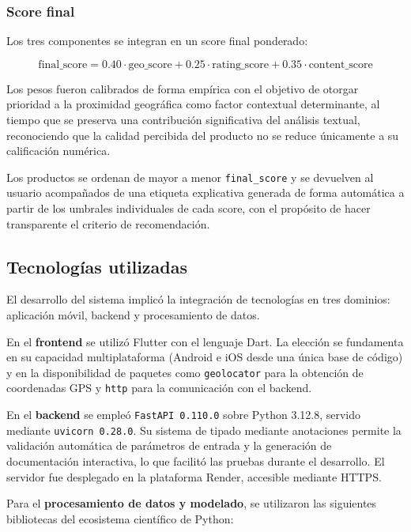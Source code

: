 \documentclass[11pt, letterpaper]{article}
\begin{document}
	\subsubsection*{Score final}
	
	Los tres componentes se integran en un score final ponderado:
	
	\begin{equation}
		\text{final\_score} = 0.40 \cdot \text{geo\_score}
		+ 0.25 \cdot \text{rating\_score}
		+ 0.35 \cdot \text{content\_score}
		\label{eq:final_score}
	\end{equation}
	
	Los pesos fueron calibrados de forma empírica con el objetivo de otorgar
	prioridad a la proximidad geográfica como factor contextual determinante,
	al tiempo que se preserva una contribución significativa del análisis textual,
	reconociendo que la calidad percibida del producto no se reduce únicamente
	a su calificación numérica.
	
	Los productos se ordenan de mayor a menor \texttt{final\_score} y se
	devuelven al usuario acompañados de una etiqueta explicativa generada de
	forma automática a partir de los umbrales individuales de cada score, con el
	propósito de hacer transparente el criterio de recomendación.
	
	\subsection{Tecnologías utilizadas}
	
	El desarrollo del sistema implicó la integración de tecnologías en tres
	dominios: aplicación móvil, backend y procesamiento de datos.
	
	En el \textbf{frontend} se utilizó Flutter con el lenguaje Dart. La elección
	se fundamenta en su capacidad multiplataforma (Android e iOS desde una única
	base de código) y en la disponibilidad de paquetes como \texttt{geolocator}
	para la obtención de coordenadas GPS y \texttt{http} para la comunicación
	con el backend.
	
	En el \textbf{backend} se empleó \texttt{FastAPI 0.110.0} sobre Python 3.12.8,
	servido mediante \texttt{uvicorn 0.28.0}. Su sistema de tipado mediante
	anotaciones permite la validación automática de parámetros de entrada y la
	generación de documentación interactiva, lo que facilitó las pruebas durante
	el desarrollo. El servidor fue desplegado en la plataforma Render, accesible
	mediante HTTPS.
	
	Para el \textbf{procesamiento de datos y modelado}, se utilizaron las
	siguientes bibliotecas del ecosistema científico de Python:
	
\end{document}
